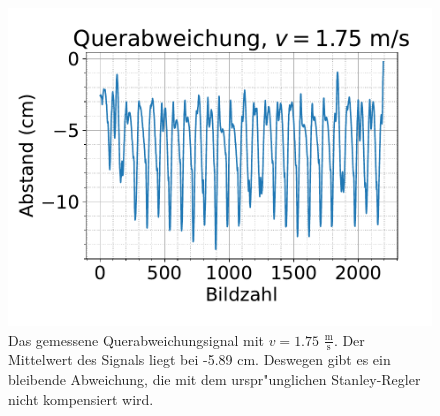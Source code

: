\documentclass[arbeit=studie,oneside,BCOR=12mm]{ArbeitRST}
\begin{document}
\begin{figure}[h]
    \centering
    \includegraphics[scale=0.47]{querabweichung}
    \caption{Das gemessene Querabweichungsignal mit $v = 1.75$ $\frac{\mathrm{m}}{\mathrm{s}}$. Der Mittelwert
    des Signals liegt bei -5.89 cm. Deswegen gibt es ein bleibende Abweichung, die 
    mit dem urspr"unglichen Stanley-Regler nicht kompensiert wird.}
    \label{quer}
\end{figure}

\printbibliography
\end{document}

